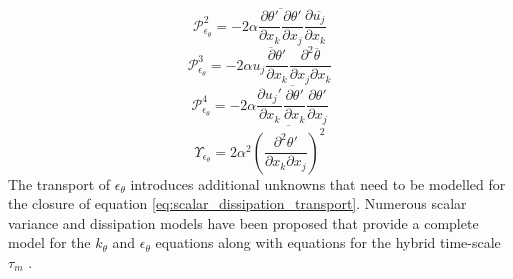 \begin{equation}
\label{eq:scalar_dissipation_production2}
\mathcal{P}_{\epsilon_{\theta}}^{2} = -2\alpha\overline{\frac{\partial \theta'}{\partial x_{k}}\frac{\partial \theta'}{\partial x_{j}}}\frac{\partial \overline{u_{j}}}{\partial x_{k}}
\end{equation}
\begin{equation}
\label{eq:scalar_dissipation_production3}
\mathcal{P}_{\epsilon_{\theta}}^{3} = -2\alpha\overline{u_{j}\frac{\partial \theta'}{\partial x_{k}}} \frac{\partial^{2} \overline{\theta}}{\partial x_{j} \partial x_{k}}
\end{equation}
\begin{equation}
\label{eq:scalar_dissipation_production4}
\mathcal{P}_{\epsilon_{\theta}}^{4} = -2\alpha\overline{\frac{\partial u_{j}'}{\partial x_{k}}\frac{\partial \theta'}{\partial x_{k}} \frac{\partial \theta'}{\partial x_{j}}}
\end{equation}
\begin{equation}
\label{eq:scalar_dissipation_destruction}
\Upsilon_{\epsilon_{\theta}} = 2\alpha^{2}\overline{\left(\frac{\partial^{2} \theta'}{\partial x_{k} \partial x_{j}}\right)^{2}}
\end{equation}
The transport of $\epsilon_{\theta}$ introduces additional unknowns that need to be modelled for the closure of equation \ref{eq:scalar_dissipation_transport}. Numerous scalar variance and dissipation models have been proposed that provide a complete model for the $k_{\theta}$ and $\epsilon_{\theta}$ equations along with equations for the hybrid time-scale $\tau_{m}$ \cite{Yoder2016}. 

